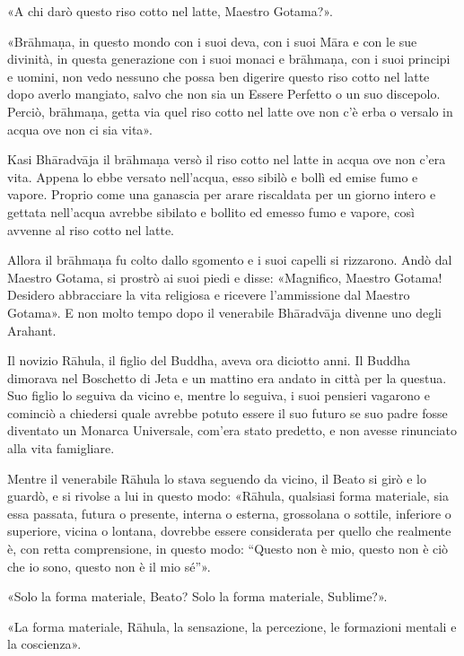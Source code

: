 «A chi darò questo riso cotto nel latte, Maestro Gotama?».

«Brāhmaṇa, in questo mondo con i suoi deva, con i suoi Māra e con le sue
divinità, in questa generazione con i suoi monaci e brāhmaṇa, con i suoi
principi e uomini, non vedo nessuno che possa ben digerire questo riso cotto nel
latte dopo averlo mangiato, salvo che non sia un Essere Perfetto o un suo
discepolo. Perciò, brāhmaṇa, getta via quel riso cotto nel latte ove non c’è
erba o versalo in acqua ove non ci sia vita».

Kasi Bhāradvāja il brāhmaṇa versò il riso cotto nel latte in acqua ove non c’era
vita. Appena lo ebbe versato nell’acqua, esso sibilò e bollì ed emise fumo e
vapore. Proprio come una ganascia per arare riscaldata per un giorno intero e
gettata nell’acqua avrebbe sibilato e bollito ed emesso fumo e vapore, così
avvenne al riso cotto nel latte.

Allora il brāhmaṇa fu colto dallo sgomento e i suoi capelli si rizzarono. Andò
dal Maestro Gotama, si prostrò ai suoi piedi e disse: «Magnifico, Maestro
Gotama! Desidero abbracciare la vita religiosa e ricevere l’ammissione dal
Maestro Gotama». E non molto tempo dopo il venerabile Bhāradvāja divenne uno
degli Arahant.


 Il novizio Rāhula, il figlio del Buddha, aveva ora
diciotto anni. Il Buddha dimorava nel Boschetto di Jeta e un mattino era andato
in città per la questua. Suo figlio lo seguiva da vicino e, mentre lo seguiva, i
suoi pensieri vagarono e cominciò a chiedersi quale avrebbe potuto essere il suo
futuro se suo padre fosse diventato un Monarca Universale, com’era stato
predetto, e non avesse rinunciato alla vita famigliare.

 Mentre il venerabile Rāhula lo stava seguendo da vicino, il
Beato si girò e lo guardò, e si rivolse a lui in questo modo: «Rāhula, qualsiasi
forma materiale, sia essa passata, futura o presente, interna o esterna,
grossolana o sottile, inferiore o superiore, vicina o lontana, dovrebbe essere
considerata per quello che realmente è, con retta comprensione, in questo modo:
“Questo non è mio, questo non è ciò che io sono, questo non è il mio sé”».

«Solo la forma materiale, Beato? Solo la forma materiale, Sublime?».

«La forma materiale, Rāhula, la sensazione, la percezione, le formazioni mentali
e la coscienza».

